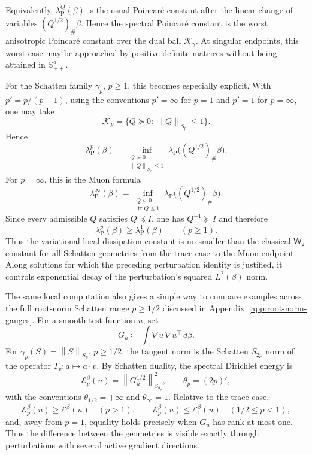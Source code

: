\documentclass{article}
\newcommand{\Wtwo}{\mathsf{W}_2}
\newcommand{\tr}{\operatorname{tr}}
\newcommand{\norm}[1]{\left\lVert #1 \right\rVert}
\newcommand{\cK}{\mathcal K_\gamma}
\newcommand{\Sppd}{\mathbb S_{++}^d}
\begin{document}
Equivalently, $\lambda_{\mathrm P}^Q(\beta)$ is the usual Poincar\'e constant
after the linear change of variables $(Q^{1/2})_\#\beta$.  Hence the spectral
Poincar\'e constant is the worst anisotropic Poincar\'e constant over the dual
ball $\cK$.  At singular endpoints, this worst case may be approached by
positive definite matrices without being attained in $\Sppd$.

For the Schatten family $\gamma_p$, $p\ge1$, this becomes especially explicit.
With $p'=p/(p-1)$, using the conventions $p'=\infty$ for $p=1$ and $p'=1$ for
$p=\infty$, one may take
\[
    \mathcal K_p=\{Q\succeq0:\ \norm{Q}_{S_{p'}}\le1\}.
\]
Hence
\[
    \lambda_{\mathrm P}^{p}(\beta)
    =
    \inf_{\substack{Q\succ0\\ \norm{Q}_{S_{p'}}\le1}}
    \lambda_{\mathrm P}\bigl((Q^{1/2})_\#\beta\bigr).
\]
For $p=\infty$, this is the Muon formula
\[
    \lambda_{\mathrm P}^{\infty}(\beta)
    =
    \inf_{\substack{Q\succ0\\ \tr Q\le1}}
    \lambda_{\mathrm P}\bigl((Q^{1/2})_\#\beta\bigr).
\]
Since every admissible $Q$ satisfies $Q\preceq I$, one has
$Q^{-1}\succeq I$ and therefore
\[
    \lambda_{\mathrm P}^{p}(\beta)
    \ge
    \lambda_{\mathrm P}^{1}(\beta)
    \qquad (p\ge1).
\]
Thus the variational local dissipation constant is no smaller than the
classical $\Wtwo$ constant for all Schatten geometries from the trace case
to the Muon endpoint. Along solutions for which the preceding perturbation
identity is justified, it controls exponential decay of the perturbation's
squared $L^2(\beta)$ norm.

The same local computation also gives a simple way to compare examples across
the full root-norm Schatten range $p\ge1/2$ discussed in
Appendix~\ref{app:root-norm-gauges}.  For a smooth test function $u$, set
\[
    G_u\coloneqq \int \nabla u\,\nabla u^\top\,d\beta .
\]
For $\gamma_p(S)=\norm{S}_{S_p}$, $p\ge1/2$, the tangent norm is the
Schatten $S_{2p}$ norm of the operator
$T_v:a\mapsto a\cdot v$. By Schatten duality, the spectral Dirichlet energy is
\[
    \mathcal E_p^\beta(u)
    =
    \norm{G_u^{1/2}}_{S_{\theta_p}}^2,
    \qquad
    \theta_p=(2p)',
\]
with the conventions $\theta_{1/2}=+\infty$ and
$\theta_\infty=1$.  Relative to the trace case,
\[
    \mathcal E_p^\beta(u)\ge\mathcal E_1^\beta(u)
    \quad (p>1),
    \qquad
    \mathcal E_p^\beta(u)\le\mathcal E_1^\beta(u)
    \quad (1/2\le p<1),
\]
and, away from $p=1$, equality holds precisely when $G_u$ has rank at most
one.  Thus the difference between the geometries is visible exactly through
perturbations with several active gradient directions.
\end{document}
